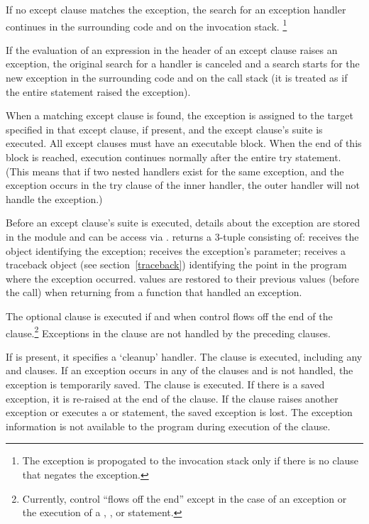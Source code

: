 If no except clause matches the exception, the search for an exception
handler continues in the surrounding code and on the invocation stack.
\footnote{The exception is propogated to the invocation stack only if
there is no  clause that negates the exception.}

If the evaluation of an expression in the header of an except clause
raises an exception, the original search for a handler is canceled
and a search starts for the new exception in the surrounding code and
on the call stack (it is treated as if the entire  statement
raised the exception).

When a matching except clause is found, the exception is assigned to
the target specified in that except clause, if present, and the except
clause's suite is executed.  All except clauses must have an
executable block.  When the end of this block is reached, execution
continues normally after the entire try statement.  (This means that
if two nested handlers exist for the same exception, and the exception
occurs in the try clause of the inner handler, the outer handler will
not handle the exception.)

Before an except clause's suite is executed, details about the
exception are stored in the  module
and can be access via . 
returns a 3-tuple consisting of:  receives
the object identifying the exception;  receives
the exception's parameter;  receives a
traceback object (see section~\ref{traceback})
identifying the point in the program where the exception occurred.
 values are restored to their previous values
(before the call) when returning from a function that handled an exception.

The optional  clause is executed if and when control
flows off the end of the  clause.\footnote{
  Currently, control ``flows off the end'' except in the case of an
  exception or the execution of a ,
  , or  statement.
} Exceptions in the  clause are not handled by the
preceding  clauses.

If  is present, it specifies a `cleanup' handler.  The
 clause is executed, including any  and
 clauses.  If an exception occurs in any of the clauses
and is not handled, the exception is temporarily saved. The
 clause is executed.  If there is a saved exception,
it is re-raised at the end of the  clause.
If the  clause raises another exception or
executes a  or  statement, the saved
exception is lost.  The exception information is not available to the
program during execution of the  clause.

